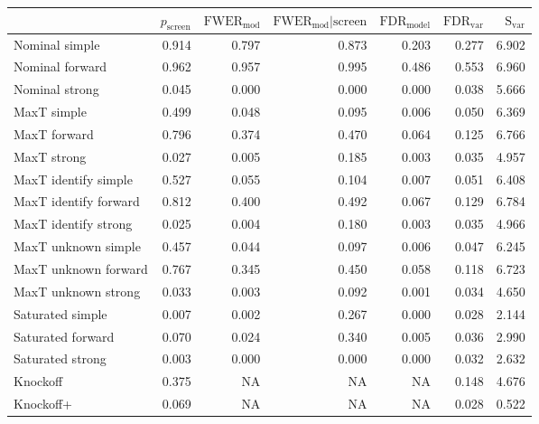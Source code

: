 
\newcommand{\guarantee}[1]{{\color{blue} #1}}
\begin{tabular}{|l|rrrrrr|}
 \hline
{} &  $p_{\text{screen}}$ &  $\text{FWER}_{\text{mod}}$ &  $\text{FWER}_{\text{mod}} \vert \text{screen}$ &  $\text{FDR}_{\text{model}}$ &  $\text{FDR}_{\text{var}}$ &  $\text{S}_{\text{var}}$ \\ \hline
Nominal simple & 0.914 & 0.797 & 0.873 & 0.203 & 0.277 & 6.902 \\ 
Nominal forward & 0.962 & 0.957 & 0.995 & 0.486 & 0.553 & 6.960 \\ 
Nominal strong & 0.045 & 0.000 & 0.000 & 0.000 & 0.038 & 5.666 \\ 
MaxT simple & 0.499 & \guarantee{0.048} & \guarantee{0.095} & \guarantee{0.006} & 0.050 & 6.369 \\ 
MaxT forward & 0.796 & 0.374 & 0.470 & \guarantee{0.064} & 0.125 & 6.766 \\ 
MaxT strong & 0.027 & \guarantee{0.005} & 0.185 & \guarantee{0.003} & 0.035 & 4.957 \\ 
MaxT identify simple & 0.527 & \guarantee{0.055} & \guarantee{0.104} & \guarantee{0.007} & 0.051 & 6.408 \\ 
MaxT identify forward & 0.812 & 0.400 & 0.492 & \guarantee{0.067} & 0.129 & 6.784 \\ 
MaxT identify strong & 0.025 & \guarantee{0.004} & 0.180 & \guarantee{0.003} & 0.035 & 4.966 \\ 
MaxT unknown simple & 0.457 & \guarantee{0.044} & \guarantee{0.097} & \guarantee{0.006} & 0.047 & 6.245 \\ 
MaxT unknown forward & 0.767 & 0.345 & 0.450 & \guarantee{0.058} & 0.118 & 6.723 \\ 
MaxT unknown strong & 0.033 & \guarantee{0.003} & 0.092 & \guarantee{0.001} & 0.034 & 4.650 \\ 
Saturated simple & 0.007 & 0.002 & 0.267 & 0.000 & 0.028 & 2.144 \\ 
Saturated forward & 0.070 & 0.024 & 0.340 & 0.005 & 0.036 & 2.990 \\ 
Saturated strong & 0.003 & 0.000 & 0.000 & 0.000 & 0.032 & 2.632 \\ 
Knockoff & 0.375 & NA & NA & NA & 0.148 & 4.676 \\ 
Knockoff+ & 0.069 & NA & NA & NA & \guarantee{0.028} & 0.522 \\   \hline
\end{tabular}